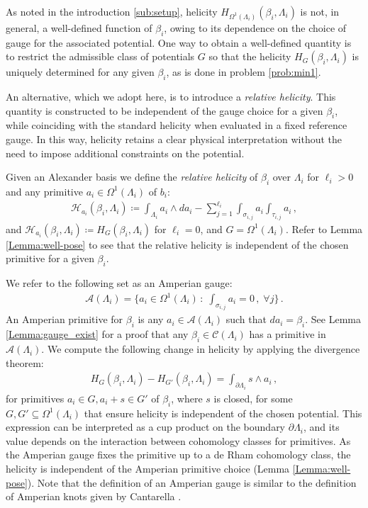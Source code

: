 \documentclass[11pt]{article}
\theoremstyle{plain}
\theoremstyle{definition}
\theoremstyle{remark}
\newcommand{\ST}{\Lambda}
\newcommand{\C}{\mathcal{C} (\ST_i)}
\begin{document}
As noted in the introduction \ref{sub:setup}, helicity \(H_{\Omega^1(\ST_i) }( \beta_i , \ST_i ) \) is not, in general, a well-defined function of \( \beta _i \), owing to its dependence on the choice of gauge for the associated potential. One way to obtain a well-defined quantity is to restrict the admissible class of potentials \(G\) so that the helicity \(H_{G }( \beta_i , \ST_i ) \) is uniquely determined for any given \( \beta _i \), as is done in problem \ref{prob:min1}. 

An alternative, which we adopt here, is to introduce a \emph{relative helicity}. This quantity is constructed to be independent of the gauge choice for a given \( \beta _i \), while coinciding with the standard helicity when evaluated in a fixed reference gauge. In this way, helicity retains a clear physical interpretation without the need to impose additional constraints on the potential.



Given an Alexander basis we define the \textit{relative helicity} of \(\beta_i\) over \(\ST_i\) for \(\ell_i > 0\) and any primitive \(a_i \in \Omega^1(\ST_i)\) of \(b_i\):
\begin{align*}
    \mathscr{H}_{a_i}(\beta_i, \ST_i) \coloneqq \int_{\ST_i} a_i \wedge da_i - \sum_{j=1}^{\ell_i} \int_{\sigma_{i,j}} a_i \int_{\tau_{i,j}} a_i \, ,
\end{align*}
and \(\mathscr{H}_{a_i}(\beta_i, \ST_i) \coloneqq H_G (\beta_i, \ST_i)\) for \(\ell_i = 0\), and \(G=\Omega^1(\ST_i)\). Refer to Lemma \ref{Lemma:well-pose} to see that the relative helicity is independent of the chosen primitive for a given \(\beta _i\). 



We refer to the following set as an Amperian gauge:
\begin{align}\label{eq:amperian}
    \mathscr{A}(\ST_i) = \bigg\{ a_i \in  \Omega^1 (\ST_i) \, : \; \int_{\sigma_{i,j}} a_i = 0 \, , \; \forall j \bigg\} \, .
\end{align}
An Amperian primitive for \(\beta _i\) is any \(a_i \in \mathscr{A}(\ST_i) \) such that \(d a_i = \beta _i\). See Lemma \ref{Lemma:gauge_exist} for a proof that any \(\beta _i \in \C\) has a primitive in \(\mathscr{A}(\ST_i)\). We compute the following change in helicity by applying the divergence theorem:
\begin{align*}
    H_{G}(\beta_i, \ST_i) - H_{G'}(\beta_i, \ST_i) = \int_{\partial \ST_i} s \wedge a_i \, ,
\end{align*}
for primitives \(a_i \in G, a_i + s \in G'\) of \(\beta _i\), where \(s\) is closed, for some \(G,G' \subseteq \Omega^1(\ST_i)\) that ensure helicity is independent of the chosen potential. This expression can be interpreted as a cup product on the boundary \( \partial \ST_i \), and its value depends on the interaction between cohomology classes for primitives. As the Amperian gauge fixes the primitive up to a de Rham cohomology class, the helicity is independent of the Amperian primitive choice (Lemma \ref{Lemma:well-pose}). Note that the definition of an Amperian gauge is similar to the definition of Amperian knots given by Cantarella \cite{plasma_flow}. 
\end{document}
